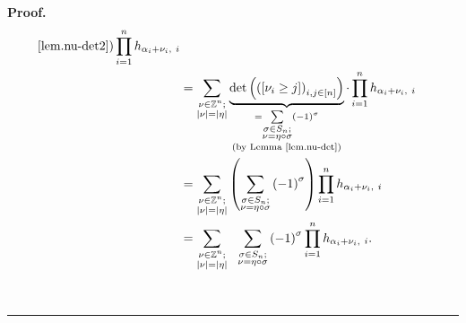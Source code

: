\documentclass[numbers=enddot,12pt,final,onecolumn,notitlepage,english]{scrartcl}%
\theoremstyle{definition}
\newenvironment{proof}[1][Proof]{\noindent\textbf{#1.} }{\ \rule{0.5em}{0.5em}}
\let\sumnonlimits\sum
\let\prodnonlimits\prod
\renewcommand{\sum}{\sumnonlimits\limits}
\renewcommand{\prod}{\prodnonlimits\limits}
\newenvironment{vershort}{}{}
\begin{document}
\begin{vershort}
\begin{proof}
\begin{align}
{{{\ref{lem.nu-det2})}}}\prod_{i=1}^{n}h_{\alpha_{i}+\nu_{i},\ i}\nonumber\\
&  =\sum_{\substack{\nu\in\mathbb{Z}^{n};\\\left\vert \nu\right\vert
=\left\vert \eta\right\vert }}\underbrace{\det\left(  \left(  \left[  \nu
_{i}\geq j\right]  \right)  _{i,j\in\left[  n\right]  }\right)  }%
_{\substack{=\sum_{\substack{\sigma\in S_{n};\\\nu=\eta\circ\sigma}}\left(
-1\right)  ^{\sigma}\\\text{(by Lemma \ref{lem.nu-det})}}}\cdot\prod_{i=1}%
^{n}h_{\alpha_{i}+\nu_{i},\ i}\nonumber\\
&  =\sum_{\substack{\nu\in\mathbb{Z}^{n};\\\left\vert \nu\right\vert
=\left\vert \eta\right\vert }}\left(  \sum_{\substack{\sigma\in S_{n}%
;\\\nu=\eta\circ\sigma}}\left(  -1\right)  ^{\sigma}\right)  \prod_{i=1}%
^{n}h_{\alpha_{i}+\nu_{i},\ i}\nonumber\\
&  =\sum_{\substack{\nu\in\mathbb{Z}^{n};\\\left\vert \nu\right\vert
=\left\vert \eta\right\vert }}\ \ \sum_{\substack{\sigma\in S_{n};\\\nu
=\eta\circ\sigma}}\left(  -1\right)  ^{\sigma}\prod_{i=1}^{n}h_{\alpha_{i}%
+\nu_{i},\ i}. \label{pf.thm.pre-pieri.short.2b}%
\end{align}



\end{proof}
\end{vershort}
\end{document}
